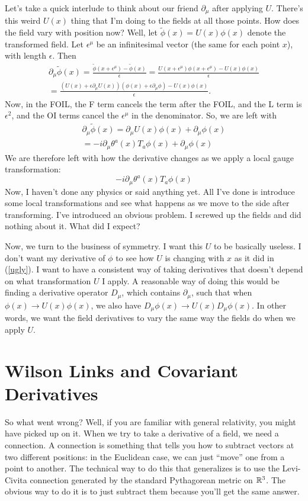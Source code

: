 \documentclass[main.tex]{subfiles}
\begin{document}
Let's take a quick interlude to think about our friend $\partial_\mu$ after applying $U$. There's this weird $U(x)$ thing that I'm doing to the fields at all those points. How does the field vary with position now? Well, let $\tilde{\phi}(x) = U (x) \phi(x)$ denote the transformed field. Let $\epsilon^\mu$ be an infinitesimal vector (the same for each point $x$), with length $\epsilon$. Then
\begin{align*}
\partial_\mu \tilde{\phi} (x) =
\frac{\tilde{\phi} (x + \epsilon^\mu) - \tilde{\phi}(x)}{\epsilon} = 
\frac{U(x + \epsilon^\mu) \phi(x + \epsilon^\mu) - U(x) \phi(x)}{\epsilon} \\ =
\frac{\left( U (x) + \epsilon \partial_\mu U (x)\right) \left(\phi(x) + \epsilon \partial_\mu \phi \right) - U(x) \phi(x)}{\epsilon}.
\end{align*}
Now, in the FOIL, the F term cancels the term after the FOIL, and the L term is $\epsilon^2$, and the OI terms cancel the $\epsilon^\mu$ in the denominator. So, we are left with
\begin{align*}
\partial_\mu \tilde{\phi} (x) = \partial_\mu U (x) \phi(x) + \partial_\mu \phi (x) \\ =
-i \partial_\mu \theta^a (x) T_a \phi(x) + \partial_\mu \phi (x)
\end{align*}
We are therefore left with how the derivative changes as we apply a local gauge transformation:
\begin{equation} \label{ugly}
-i \partial_\mu \theta^a (x) T_a \phi(x) 
\end{equation}
Now, I haven't done any physics or said anything yet. All I've done is introduce some local transformations and see what happens as we move to the side after transforming. I've introduced an obvious problem. I screwed up the fields and did nothing about it. What did I expect?

Now, we turn to the business of symmetry. I want this $U$ to be basically useless. I don't want my derivative of $\phi$ to see how $U$ is changing with $x$ as it did in (\ref{ugly}). I want to have a consistent way of taking derivatives that doesn't depend on what transformation $U$ I apply. A reasonable way of doing this would be finding a derivative operator $D_\mu$, which contains $\partial_\mu$, such that when $\phi (x) \to U(x) \phi(x)$, we also have $D_\mu \phi(x) \to U(x) D_\mu \phi(x)$. In other words, we want the field derivatives to vary the same way the fields do when we apply $U$.

\section{Wilson Links and Covariant Derivatives}
So what went wrong? Well, if you are familiar with general relativity, you might have picked up on it. When we try to take a derivative of a field, we need a connection. A connection is something that tells you how to subtract vectors at two different positions: in the Euclidean case, we can just ``move'' one from a point to another. The technical way to do this that generalizes is to use the Levi-Civita connection generated by the standard Pythagorean metric on $\mathbb{R}^3$. The obvious way to do it is to just subtract them because you'll get the same answer. 
\end{document}
